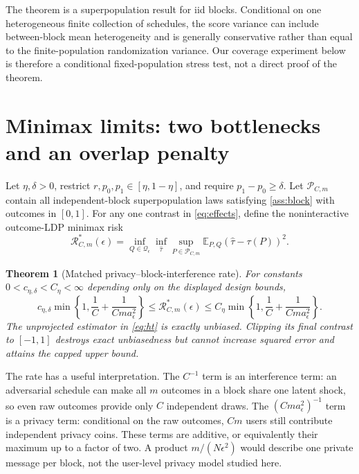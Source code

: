 \documentclass[10pt]{article}
\newtheorem{theorem}{Theorem}
\theoremstyle{definition}
\theoremstyle{remark}
\newcommand{\E}{\mathbb{E}}
\newcommand{\doisig}{a_{\epsilon}}
\begin{document}
The theorem is a superpopulation result for iid blocks. Conditional on one heterogeneous
finite collection of schedules, the score variance can include between-block mean
heterogeneity and is generally conservative rather than equal to the finite-population
randomization variance. Our coverage experiment below is therefore a conditional
fixed-population stress test, not a direct proof of the theorem.

\section{Minimax limits: two bottlenecks and an overlap penalty}
\label{sec:minimax}

Let $\eta,\delta>0$, restrict $r,p_0,p_1\in[\eta,1-\eta]$, and require
$p_1-p_0\ge\delta$. Let
$\mathcal P_{C,m}$ contain all independent-block superpopulation laws satisfying
\cref{ass:block} with outcomes in $[0,1]$. For any one contrast in \eqref{eq:effects}, define
the noninteractive outcome-LDP minimax risk
\[
  \mathcal R^*_{C,m}(\epsilon)
  =\inf_{Q\in\mathcal Q_{\epsilon}}\inf_{\widehat\tau}
    \sup_{P\in\mathcal P_{C,m}}
    \E_{P,Q}(\widehat\tau-\tau(P))^2.
\]

\begin{theorem}[Matched privacy--block-interference rate]
\label{thm:minimax}
For constants $0<c_{\eta,\delta}<C_{\eta}<\infty$ depending only on the displayed
design bounds,
\begin{equation}
  c_{\eta,\delta}\min\!\left\{1,\frac1C+\frac{1}{Cm\doisig^2}\right\}
  \le \mathcal R^*_{C,m}(\epsilon)
  \le C_{\eta}\min\!\left\{1,\frac1C+\frac{1}{Cm\doisig^2}\right\}.
  \label{eq:minimax}
\end{equation}
The unprojected estimator in \eqref{eq:ht} is exactly unbiased. Clipping its final contrast to
$[-1,1]$ destroys exact unbiasedness but cannot increase squared error and attains the capped
upper bound.
\end{theorem}

The rate has a useful interpretation. The $C^{-1}$ term is an interference term: an
adversarial schedule can make all $m$ outcomes in a block share one latent shock, so even raw
outcomes provide only $C$ independent draws. The $(Cm\doisig^2)^{-1}$ term is a privacy term:
conditional on the raw outcomes, $Cm$ users still contribute independent privacy coins. These
terms are additive, or equivalently their maximum up to a factor of two. A product
$m/(N\epsilon^2)$ would describe one private message per block, not the user-level privacy
model studied here.
\end{document}
